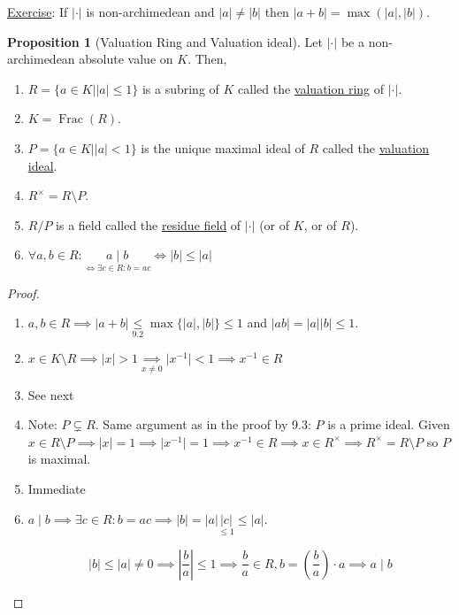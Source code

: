 \documentclass[openany]{amsbook}
\numberwithin{section}{chapter}
\theoremstyle{definition}
\newtheorem{proposition}[theorem]{Proposition}
\newcommand{\Frac}{\operatorname{Frac}}
\begin{document}
\underline{Exercise}: If \(\vert \cdot \vert \) is non-archimedean and \(\vert a \vert \neq \vert b \vert \) then \(\vert a+b \vert = \max (\vert a \vert , \vert b \vert )\).

\begin{proposition}
    [Valuation Ring and Valuation ideal] Let \(\vert \cdot \vert \) be a non-archimedean absolute value on \(K\). Then,

    \begin{enumerate}[label=\roman*)]
        \item \(R = \{ a\in K \mid \vert a \vert \leq 1 \}\) is a subring of \(K\) called the \underline{valuation ring} of \(\vert \cdot \vert\).
        \item \(K = \Frac(R)\).
        \item \(P = \{ a\in K \mid \vert a \vert < 1 \} \) is the unique maximal ideal of \(R\) called the \underline{valuation ideal}.
        \item \(R^\times = R \setminus P\).
        \item \(R / P\) is a field called the \underline{residue field} of \(\vert \cdot \vert\) (or of \(K\), or of \(R\)).
        \item \(\forall a,b\in R : \underset{\iff \exists c\in R : b = ac}{a\mid b} \iff \vert b \vert \leq \vert a \vert\)
    \end{enumerate} 
\end{proposition}

\begin{proof}
    \begin{enumerate}[label=\roman*)]
        \item \(a,b \in R \implies \vert a + b \vert \underset{9.2}{\leq} \max \{ \vert a \vert , \vert b \vert  \} \leq  1\) and \(\vert ab \vert = \vert a \vert \vert b \vert \leq 1\).
        \item \(x\in K \setminus R \implies \vert x \vert > 1 \underset{x\neq 0}{\implies} \vert x ^{-1} \vert < 1 \implies x ^{-1} \in R\)  
        \item See next
        \item Note: \(P \subsetneq R\). Same argument as in the proof by 9.3: \(P\) is a prime ideal. Given \(x\in R \setminus P \implies \vert x \vert = 1 \implies \vert x ^{-1}  \vert = 1 \implies x ^{-1} \in R \implies x \in R^\times \implies R^\times = R \setminus P\) so \(P\) is maximal.
        \item Immediate
        \item \(a\mid b \implies \exists c\in R : b = ac \implies \vert b \vert = \vert a \vert \underset{\leq 1}{\vert c \vert } \leq \vert a \vert\).
        
        \[
            \vert b \vert \leq \vert a \vert \neq 0 \implies \left\vert \frac{b}{a} \right\vert \leq 1 \implies \frac{b}{a}\in R, b = \left( \frac{b}{a} \right) \cdot a \implies a\mid b
        \]
    \end{enumerate} 
\end{proof}
\end{document}

